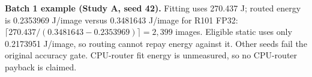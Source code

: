 \textbf{Batch 1 example (Study A, seed 42).} Fitting uses 270.437 J; routed energy is 0.2353969 J/image versus 0.3481643 J/image for R101 FP32: $\lceil 270.437/(0.3481643-0.2353969)\rceil=2,399$ images. Eligible static uses only 0.2173951 J/image, so routing cannot repay energy against it. Other seeds fail the original accuracy gate. CPU-router fit energy is unmeasured, so no CPU-router payback is claimed.

